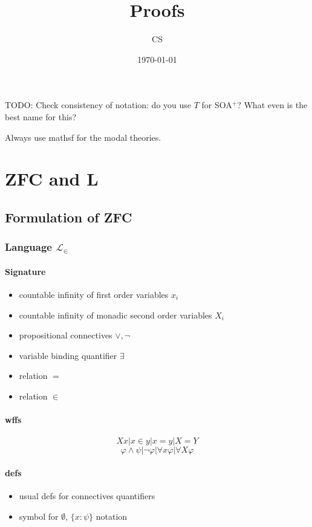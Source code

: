 \documentclass{article}
\title{Proofs}
\author{CS}
\date{\today}
\begin{document}
\maketitle
TODO: 
Check consistency of notation: do you use $T$ for SOA$^+$? What even is the best 
name for this?

Always use mathsf for the modal theories.
\section{ZFC and L}

\subsection{Formulation of ZFC}
\subsubsection{Language $\mathcal{L}_\in$}
\paragraph{Signature}
\begin{itemize}
    \item countable infinity of first order variables $x_i$
    \item countable infinity of monadic second order variables $X_i$
    \item propositional connectives $\vee, \neg$
    \item variable binding quantifier $\exists$
    \item relation $=$
    \item relation $\in$
\end{itemize}

\paragraph{wffs}
    $$Xx | x \in y | x = y | X = Y$$
    $$\varphi \wedge \psi | \neg \varphi | \forall x \varphi | \forall X \varphi $$

\paragraph{defs}
\begin{itemize}
    \item usual defs for connectives quantifiers
    \item symbol for $\emptyset$, $\{x : \psi \}$ notation
\end{itemize}
\end{document}
